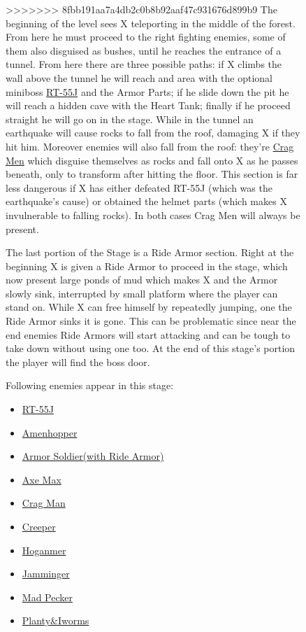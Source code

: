\begin{figure}[htp]
>>>>>>> 8fbb191aa7a4db2c0b8b92aaf47c931676d899b9
The beginning of the level sees X teleporting in the middle of the forest. From here he must proceed to the right fighting enemies, some of them also disguised as bushes, until he reaches the entrance of a tunnel. From here there are three possible paths: if X climbs the wall above the tunnel he will reach and area with the optional miniboss \hyperlink{miniboss:RT-55J}{RT-55J} and the Armor Parts; if he slide down the pit he will reach a hidden cave with the Heart Tank; finally if he proceed straight he will go on in the stage. While in the tunnel an earthquake will cause rocks to fall from the roof, damaging X if they hit him. Moreover enemies will also fall from the roof: they're \hyperlink{enem:Crag_man}{Crag Men} which disguise themselves as rocks and fall onto X as he passes beneath, only to transform after hitting the floor. This section is far less dangerous if X has either defeated RT-55J (which was the earthquake's cause) or obtained the helmet parts (which makes X invulnerable to falling rocks). In both cases Crag Men will always be present.

The last portion of the Stage is a Ride Armor section. Right at the beginning X is given a Ride Armor to proceed in the stage, which now present large ponds of mud which makes X and the Armor slowly sink, interrupted by small platform where the player can stand on. While X can free himself by repeatedly jumping, one the Ride Armor sinks it is gone. This can be problematic since near the end enemies Ride Armors will start attacking and can be tough to take down without using one too. At the end of this stage's portion the player will find the boss door.

Following enemies appear in this stage\cite{wiki:Forest}:
\begin{itemize}
	\item \hyperlink {miniboss:RT-55J}{RT-55J}
	\item \hyperlink {enem:Amenhopper} {Amenhopper}
	\item \hyperlink {enem:Armor_Soldier} {Armor Soldier(with Ride Armor)}
	\item \hyperlink {enem:Axe_Max} {Axe Max}
	\item \hyperlink {enem:Crag_Man} {Crag Man}
	\item \hyperlink {enem:Creeper} {Creeper}
	\item \hyperlink {enem:Hoganmer} {Hoganmer}
	\item \hyperlink {enem:Jamminger} {Jamminger}
	\item \hyperlink {enem:Mad_Pecker} {Mad Pecker}
	\item \hyperlink {enem:Planty_Iworms} {Planty\&Iworms}
\end{itemize}


\end{figure}
